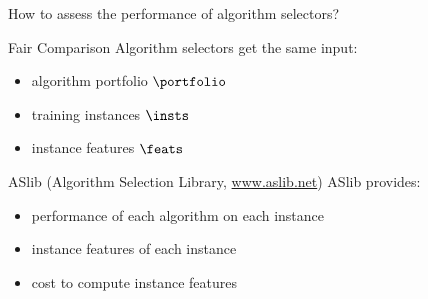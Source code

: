 \documentclass[t]{beamer}
\begin{document}
\begin{frame}[c]{How to assess the performance of algorithm selectors?}

\begin{block}{Fair Comparison}
Algorithm selectors get the same input:
\begin{itemize}
  \item algorithm portfolio $\portfolio$
  \item training instances $\insts$
  \item instance features $\feats$
\end{itemize}
\end{block}

\begin{block}{ASlib (Algorithm Selection Library, \url{www.aslib.net})}
ASlib provides:
\begin{itemize}
  \item performance of each algorithm on each instance
  \item instance features of each instance
  \item cost to compute instance features
\end{itemize}
\end{block}

\end{frame}
\end{document}
